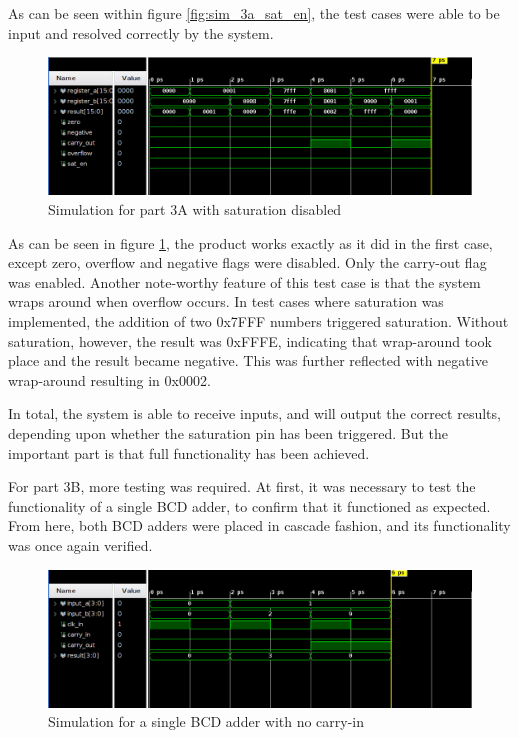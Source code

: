 \documentclass[12pt,a4paper]{article}
\begin{document}
As can be seen within figure \ref{fig:sim_3a_sat_en}, the test cases were able to be input and resolved correctly by the system.

\begin{figure}[H]
    \centering
    \includegraphics[scale=0.25]{images/sim_3a_no_sat.png}
    \caption{Simulation for part 3A with saturation disabled}
    \label{fig:sim_3a_no_sat}
\end{figure}

As can be seen in figure \ref{fig:sim_3a_no_sat}, the product works exactly as it did in the first case, except zero, overflow and negative flags were disabled. Only the carry-out flag was enabled. Another note-worthy feature of this test case is that the system wraps around when overflow occurs. In test cases where saturation was implemented, the addition of two 0x7FFF numbers triggered saturation. Without saturation, however, the result was 0xFFFE, indicating that wrap-around took place and the result became negative. This was further reflected with negative wrap-around resulting in 0x0002.

In total, the system is able to receive inputs, and will output the correct results, depending upon whether the saturation pin has been triggered. But the important part is that full functionality has been achieved.

For part 3B, more testing was required. At first, it was necessary to test the functionality of a single BCD adder, to confirm that it functioned as expected. From here, both BCD adders were placed in cascade fashion, and its functionality was once again verified.

\begin{figure}[H]
    \centering
    \includegraphics[scale=0.25]{images/sim_single_no_carry.png}
    \caption{Simulation for a single BCD adder with no carry-in}
    \label{fig:sim_single_no_carry}
\end{figure}
\end{document}
